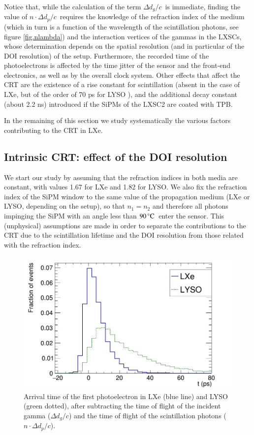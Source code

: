 \documentclass[review]{elsarticle}
\begin{document}
Notice that, while the calculation of the term $\Delta d_g/c$~is immediate, finding the value
of $n \cdot \Delta d_p/c$~requires the knowledge of the refraction index of the medium (which in turn is a function of the wavelength of the scintillation photons, see figure \ref{fig.nlambda}) and the interaction vertices of the gammas in the LXSCs, whose determination depends on the spatial resolution (and in particular of the DOI resolution) of the setup. Furthermore, the recorded time of the photoelectrons is affected by the time jitter of the sensor and the front-end electronics, as well as by the overall clock system. Other effects that affect the CRT are the existence of a rise constant for scintillation (absent in the case of LXe, but of the order of 70 ps for LYSO \cite{Seifert}), and the additional decay constant (about 2.2 ns) introduced if the SiPMs of the LXSC2 are coated with TPB. 

In the remaining of this section we study systematically the various factors contributing to the CRT in LXe. 

\subsection*{Intrinsic CRT: effect of the DOI resolution}
We start our study by assuming that the refraction indices in both media are constant, with values 1.67 for LXe and 
1.82 for LYSO. We also fix the refraction index of the SiPM window to the same value of the propagation medium (LXe or LYSO, depending on the setup), so that $n_1 = n_2$ and therefore all photons impinging the SiPM with an angle less than $90\,^{\circ}{\rm C}$~enter the sensor. This (unphysical) assumptions are made in order to separate the contributions to the CRT due to the scintillation lifetime and the DOI resolution from those related with the refraction index. 

\begin{figure}[!bhtp]
	\centering
	\includegraphics[scale=0.36]{../img/FirstPEScintLXeLYSO.png}
	\caption{\label{fig.firstPE} Arrival time of the first photoelectron in LXe (blue line) and LYSO (green dotted), after subtracting the time of flight of the incident gamma ($\Delta d_g/c$) and the time of flight of the scintillation photons ($n \cdot \Delta d_p/c$). }\label{fig.FirstPE}
\end{figure} 
\end{document}
